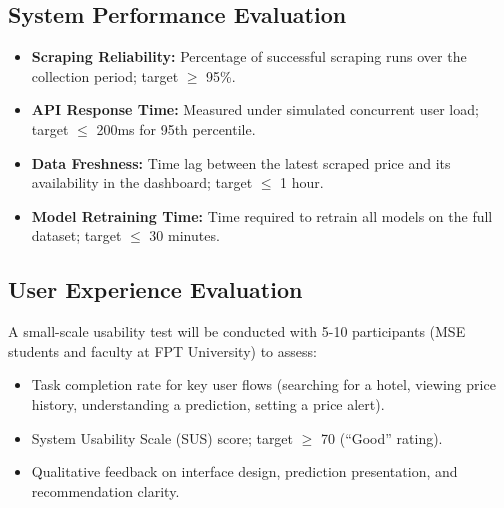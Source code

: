 \documentclass[12pt,a4paper]{report}
\begin{document}
\subsection{System Performance Evaluation}

\begin{itemize}
    \item \textbf{Scraping Reliability:} Percentage of successful scraping runs over the collection period; target $\geq$ 95\%.
    \item \textbf{API Response Time:} Measured under simulated concurrent user load; target $\leq$ 200ms for 95th percentile.
    \item \textbf{Data Freshness:} Time lag between the latest scraped price and its availability in the dashboard; target $\leq$ 1 hour.
    \item \textbf{Model Retraining Time:} Time required to retrain all models on the full dataset; target $\leq$ 30 minutes.
\end{itemize}

\subsection{User Experience Evaluation}

A small-scale usability test will be conducted with 5-10 participants (MSE students and faculty at FPT University) to assess:
\begin{itemize}
    \item Task completion rate for key user flows (searching for a hotel, viewing price history, understanding a prediction, setting a price alert).
    \item System Usability Scale (SUS) score; target $\geq$ 70 (``Good'' rating).
    \item Qualitative feedback on interface design, prediction presentation, and recommendation clarity.
\end{itemize}
\end{document}
